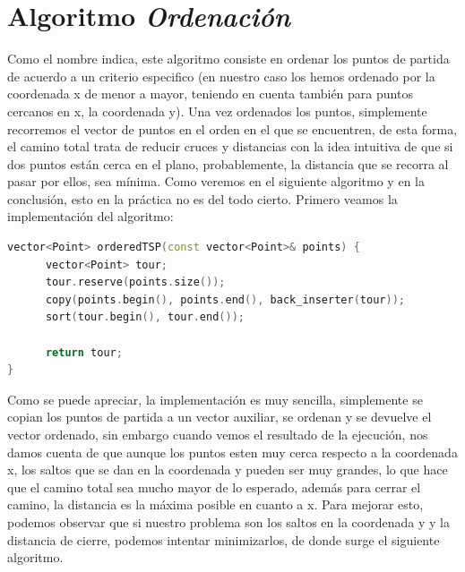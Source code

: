 \documentclass[11pt,openany]{book}
\begin{document}
\section{Algoritmo \textit{Ordenación}}
Como el nombre indica, este algoritmo consiste en ordenar los puntos de partida de
acuerdo a un criterio especifico (en nuestro caso los hemos ordenado por la coordenada
x de menor a mayor, teniendo en cuenta también para puntos cercanos en x, la coordenada y).
Una vez ordenados los puntos, simplemente recorremos el vector de puntos en el orden
en el que se encuentren, de esta forma, el camino total trata de reducir cruces y distancias
con la idea intuitiva de que si dos puntos están cerca en el plano, probablemente, la 
distancia que se recorra al pasar por ellos, sea mínima. Como veremos en el siguiente 
algoritmo y en la conclusión, esto en la práctica no es del todo cierto. Primero veamos 
la implementación del algoritmo:
\begin{lstlisting}[language=C++]
vector<Point> orderedTSP(const vector<Point>& points) {
      vector<Point> tour;
      tour.reserve(points.size());
      copy(points.begin(), points.end(), back_inserter(tour));
      sort(tour.begin(), tour.end());
        
      return tour;
}      
\end{lstlisting}
Como se puede apreciar, la implementación es muy sencilla, simplemente se copian los puntos
de partida a un vector auxiliar, se ordenan y se devuelve el vector ordenado, sin embargo
cuando vemos el resultado de la ejecución, nos damos cuenta de que aunque los puntos
esten muy cerca respecto a la coordenada x, los saltos que se dan en la coordenada y
pueden ser muy grandes, lo que hace que el camino total sea mucho mayor de lo esperado,
además para cerrar el camino, la distancia es la máxima posible en cuanto a x. Para mejorar
esto, podemos observar que si nuestro problema son los saltos en la coordenada y 
y la distancia de cierre, podemos intentar minimizarlos, de donde surge el siguiente
algoritmo.
\end{document}
